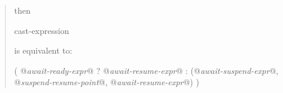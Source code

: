 \begin{quote}
then

\begin{ncbnf}
   cast-expression
\end{ncbnf}
is equivalent to:

\begin{codeblock}
  (
  @\textit{await-ready-expr}@ ? @\textit{await-resume-expr}@
  : (@\textit{await-suspend-expr}@, @\textit{suspend-resume-point}@, @\textit{await-resume-expr}@)
  )
\end{codeblock}


%  

\end{quote}
